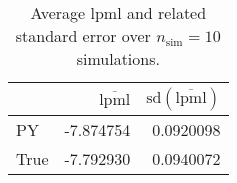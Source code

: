 \begin{table}[H]

\caption{Average lpml and related standard error over $n_{\text{sim}} = 10$ simulations.}
\centering
\begin{tabular}[t]{lrr}
\toprule
  & $\overbar{\text{lpml}}$ & $\text{sd}(\overbar{\text{lpml}})$\\
\midrule
PY & -7.874754 & 0.0920098\\
True & -7.792930 & 0.0940072\\
\bottomrule
\end{tabular}
\end{table}